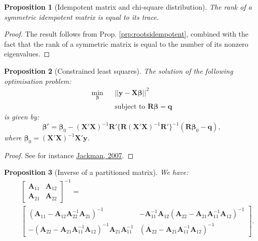 \documentclass[
  11pt,
]{book}
\newtheorem{proposition}{Proposition}[chapter]
\theoremstyle{definition}
\theoremstyle{definition}
\theoremstyle{definition}
\theoremstyle{definition}
\theoremstyle{remark}
\begin{document}
\begin{proposition}[Idempotent matrix and chi-square distribution]
\protect\hypertarget{prp:chi2idempotent}{}\label{prp:chi2idempotent}The rank of a symmetric idempotent matrix is equal to its trace.
\end{proposition}

\begin{proof}
The result follows from Prop. \ref{prp:rootsidempotent}, combined with the fact that the rank of a symmetric matrix is equal to the number of its nonzero eigenvalues.
\end{proof}

\begin{proposition}[Constrained least squares]
\protect\hypertarget{prp:constrainedLS}{}\label{prp:constrainedLS}The solution of the following optimisation problem:
\begin{eqnarray*}
\underset{\boldsymbol\beta}{\min} && || \mathbf{y} - \mathbf{X}\boldsymbol\beta ||^2 \\
&& \mbox{subject to } \mathbf{R}\boldsymbol\beta = \mathbf{q}
\end{eqnarray*}
is given by:
\[
\boxed{\boldsymbol\beta^r = \boldsymbol\beta_0 - (\mathbf{X}'\mathbf{X})^{-1} \mathbf{R}'\{\mathbf{R}(\mathbf{X}'\mathbf{X})^{-1}\mathbf{R}'\}^{-1}(\mathbf{R}\boldsymbol\beta_0 - \mathbf{q}),}
\]
where \(\boldsymbol\beta_0=(\mathbf{X}'\mathbf{X})^{-1}\mathbf{X}'\mathbf{y}\).
\end{proposition}

\begin{proof}
See for instance \href{http://jackman.stanford.edu/classes/350B/07/ftestforWeb.pdf}{Jackman, 2007}.
\end{proof}

\begin{proposition}[Inverse of a partitioned matrix]
\protect\hypertarget{prp:inversepartitioned}{}\label{prp:inversepartitioned}We have:
\begin{eqnarray*}
&&\left[ \begin{array}{cc} \mathbf{A}_{11} & \mathbf{A}_{12} \\ \mathbf{A}_{21} & \mathbf{A}_{22} \end{array}\right]^{-1} = \\
&&\left[ \begin{array}{cc} (\mathbf{A}_{11} - \mathbf{A}_{12}\mathbf{A}_{22}^{-1}\mathbf{A}_{21})^{-1} & - \mathbf{A}_{11}^{-1}\mathbf{A}_{12}(\mathbf{A}_{22} - \mathbf{A}_{21}\mathbf{A}_{11}^{-1}\mathbf{A}_{12})^{-1} \\
-(\mathbf{A}_{22} - \mathbf{A}_{21}\mathbf{A}_{11}^{-1}\mathbf{A}_{12})^{-1}\mathbf{A}_{21}\mathbf{A}_{11}^{-1} & (\mathbf{A}_{22} - \mathbf{A}_{21}\mathbf{A}_{11}^{-1}\mathbf{A}_{12})^{-1} \end{array} \right].
\end{eqnarray*}
\end{proposition}
\end{document}
